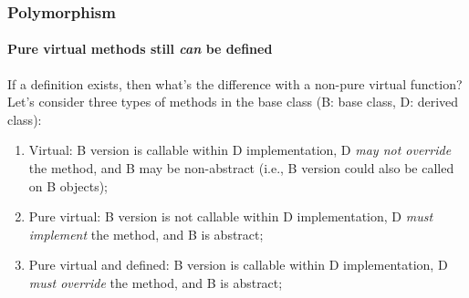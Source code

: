\begin{frame}[fragile]
\frametitle{Polymorphism}
\framesubtitle{Pure virtual methods still {\em can} be defined}

\begin{block}{If a definition exists, then what's the difference with a non-pure virtual function?}
Let's consider three types of methods in the base class (B: base class, D: derived class):
\begin{enumerate}
\item Virtual: B version is callable within D implementation, D {\em may not override} the method, and B may be non-abstract (i.e., B version could also be called on B objects);
\pause
\item Pure virtual: B version is not callable within D implementation, D {\em must implement} the method, and B is abstract;
\pause
\item Pure virtual and defined: B version is callable within D implementation, D {\em must override} the method, and B is abstract;
\end{enumerate}
\end{block}



\end{frame}